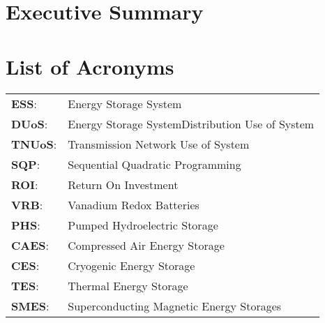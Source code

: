 \documentclass[fontsize=9.5pt]{extarticle}
\numberwithin{figure}{section} %
\begin{document}
\section*{Executive Summary}\label{ExecSummary}

\newpage

\tableofcontents


\newpage
{}
\listoffigures
{}
\listoftables
{}
\section*{List of Acronyms}\label{acronyms}
\begin{tabular}{p{1cm}p{12cm}}
\textbf{ESS}:& Energy Storage System \\
\textbf{DUoS}:& Energy Storage SystemDistribution Use of System\\
\textbf{TNUoS}:& Transmission Network Use of System\\
\textbf{SQP}:& Sequential Quadratic Programming\\
\textbf{ROI}:& Return On Investment\\
\textbf{VRB}:& Vanadium Redox Batteries\\
\textbf{PHS}:& Pumped Hydroelectric Storage\\
\textbf{CAES}:& Compressed Air Energy Storage\\
\textbf{CES}:& Cryogenic Energy Storage\\
\textbf{TES}:& Thermal Energy Storage\\
\textbf{SMES}:& Superconducting Magnetic Energy Storages\\
\end{tabular}

\newpage
\end{document}
